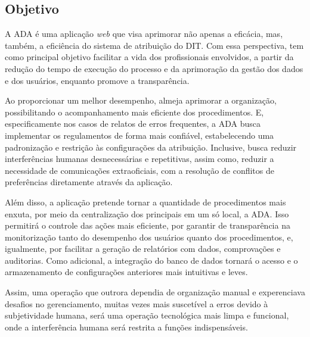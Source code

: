 \documentclass[12pt]{article}
\begin{document}
\subsection{Objetivo}
\par A ADA é uma aplicação \textit{web} que visa aprimorar não apenas a eficácia, mas, também, a eficiência do sistema de atribuição do DIT. Com essa perspectiva, tem como principal objetivo facilitar a vida dos profissionais envolvidos, a partir da redução do tempo de execução do processo e da aprimoração da gestão dos dados e dos usuários, enquanto promove a transparência. 
\par Ao proporcionar um melhor desempenho, almeja aprimorar a organização, possibilitando o acompanhamento mais eficiente dos procedimentos. E, especificamente nos casos de relatos de erros frequentes, a ADA busca implementar os regulamentos de forma mais confiável, estabelecendo uma padronização e restrição às configurações da atribuição. Inclusive, busca reduzir interferências humanas desnecessárias e repetitivas, assim como, reduzir a necessidade de comunicações extraoficiais, com a resolução de conflitos de preferências diretamente através da aplicação. 
\par Além disso, a aplicação pretende tornar a quantidade de procedimentos mais enxuta, por meio da centralização dos principais em um só local, a ADA. Isso permitirá o controle das ações mais eficiente, por garantir de transparência na monitorização tanto do desempenho dos usuários quanto dos procedimentos, e, igualmente, por facilitar a geração de relatórios com dados, comprovações e auditorias. Como adicional, a integração do banco de dados tornará o acesso e o armazenamento de configurações anteriores mais intuitivas e leves.
\par Assim, uma operação que outrora dependia de organização manual e experenciava desafios no gerenciamento, muitas vezes mais suscetível a erros devido à subjetividade humana, será uma operação tecnológica mais limpa e funcional, onde a interferência humana será restrita a funções indispensáveis.
\end{document}
